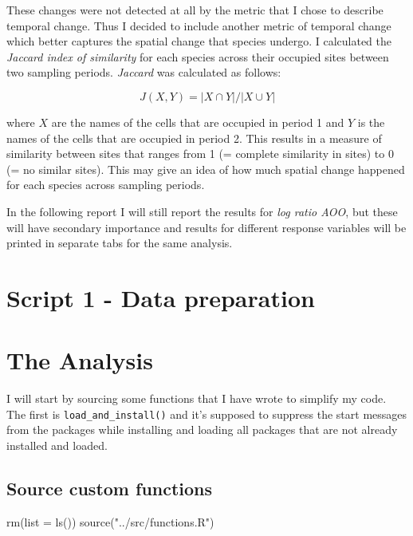 \documentclass[
  letterpaper,
  DIV=11,
  numbers=noendperiod]{scrreprt}
\newenvironment{Shaded}{\begin{snugshade}}{\end{snugshade}}
\newcommand{\AttributeTok}[1]{\textcolor[rgb]{0.40,0.45,0.13}{#1}}
\newcommand{\FunctionTok}[1]{\textcolor[rgb]{0.28,0.35,0.67}{#1}}
\newcommand{\NormalTok}[1]{\textcolor[rgb]{0.00,0.23,0.31}{#1}}
\newcommand{\StringTok}[1]{\textcolor[rgb]{0.13,0.47,0.30}{#1}}
\begin{document}
These changes were not detected at all by the metric that I chose to
describe temporal change. Thus I decided to include another metric of
temporal change which better captures the spatial change that species
undergo. I calculated the \emph{Jaccard index of similarity} for each
species across their occupied sites between two sampling periods.
\emph{Jaccard} was calculated as follows:

\[
J(X,Y) = |X∩Y| / |X∪Y|
\]

where \(X\) are the names of the cells that are occupied in period 1 and
\(Y\) is the names of the cells that are occupied in period 2. This
results in a measure of similarity between sites that ranges from 1 (=
complete similarity in sites) to 0 (= no similar sites). This may give
an idea of how much spatial change happened for each species across
sampling periods.

In the following report I will still report the results for \emph{log
ratio AOO}, but these will have secondary importance and results for
different response variables will be printed in separate tabs for the
same analysis.


\chapter{Script 1 - Data preparation}\label{script-1---data-preparation}


\chapter{The Analysis}\label{the-analysis}

I will start by sourcing some functions that I have wrote to simplify my
code. The first is \texttt{load\_and\_install()} and it's supposed to
suppress the start messages from the packages while installing and
loading all packages that are not already installed and loaded.

\section{Source custom functions}

\begin{Shaded}
\begin{Highlighting}[]
\FunctionTok{rm}\NormalTok{(}\AttributeTok{list =} \FunctionTok{ls}\NormalTok{())}
\FunctionTok{source}\NormalTok{(}\StringTok{"../src/functions.R"}\NormalTok{)}
\end{Highlighting}
\end{Shaded}
\end{document}
